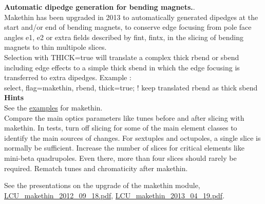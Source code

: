 \documentclass{article}    %
\begin{document}
\noindent
{\bf Automatic dipedge generation for bending magnets.}.\\
Makethin has been upgraded in 2013 to automatically generated dipedges at the start and/or end of bending magnets, to conserve edge focusing from pole face angles e1, e2 or extra fields described by fint, fintx, in the slicing of bending magnets to thin multipole slices.\\
Selection with \textsf{\color{darkgreen}THICK=true} will translate a complex thick rbend or sbend including edge effects to a simple thick sbend in which the edge focusing is transferred to extra dipedges. Example :\\
\textsf{\color{darkgreen}select, flag=makethin, rbend, thick=true; ! keep translated rbend as thick sbend}\\

\noindent
{\bf Hints}\\
See the \href{http://madx.web.cern.ch/madx/madX/examples/makethin/}{examples} for makethin.\\
Compare the main optics parameters like tunes before and after slicing with makethin.
In tests, turn off slicing for some of the main element classes to identify the main sources of changes.
For sextuples and octupoles, a single slice is normally be sufficient.
Increase the number of slices for critical elements like mini-beta quadrupoles. Even there, more than four slices should rarely be required.
Rematch tunes and chromaticity after makethin.

\noindent
See the presentations on the upgrade of the makethin module,\\
\href{http://ab-dep-abp.web.cern.ch/ab-dep-abp/LCU/LCU_meetings/2012/20120918/LCU_makethin_2012_09_18.pdf}{LCU\_makethin\_2012\_09\_18.pdf},
\hspace{0.2cm}
\href{http://ab-dep-abp.web.cern.ch/ab-dep-abp/LCU/LCU_meetings/2013/20130419/LCU_makethin_2013_04_19.pdf}{LCU\_makethin\_2013\_04\_19.pdf}.
\end{document}
